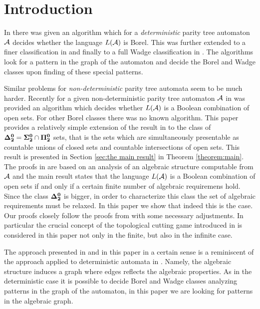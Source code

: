 
\section{Introduction}
In \cite{niwalu} there was given an algorithm which for a \emph{deterministic} parity tree automaton ${\mathcal A}$ decides whether the language $L({\mathcal A})$ is Borel. This was further extended to a finer classification in \cite{murlak2} and finally to a full Wadge classification in \cite{murlak}. The algorithms look for a pattern in the graph of the automaton and decide the Borel and Wadge classes upon finding of these special patterns. 

Similar problems for \emph{non-deterministic} parity tree automata seem to be much harder. 
Recently for a given non-deterministic parity tree automaton ${\mathcal A}$ in \cite{bp} was provided an algorithm which decides
whether $L({\mathcal A})$ is a Boolean combination of open sets. For other Borel classes there was no known algorithm. This paper provides a relatively simple extension 
of the result in \cite{bp} to the class of ${\bf \Delta^0_2} = {\bf\Sigma^0_2}\cap{\bf\Pi^0_2}$ sets, that is the sets which are simultaneously presentable as countable unions of closed sets and countable intersections of open sets. This result is presented in Section \ref{sec:the main result} in Theorem \ref{theorem:main}. The proofs in \cite{bp} are based on an analysis of an algebraic structure computable from ${\mathcal A}$ and the main result states that the language $L({\mathcal A})$ is a Boolean combination of open sets if and only if a certain finite number of algebraic requiremens hold. Since the class ${\bf \Delta^0_2}$ is bigger, in order to characterize this class the set of algebraic requirements must be relaxed. In this paper we show that indeed this is the case. Our proofs closely follow the proofs from \cite{bp} with some necessary adjustments. In particular the crucial concept of the topological cutting game introduced in \cite{bp} is considered in this paper not only in the finite, but also in the infinite case. 

The approach presented in \cite{bp} and in this paper in a certain sense is a reminiscent of the approach applied to deterministic automata in \cite{murlak2,murlak,niwalu}. Namely, the algebraic structure induces a graph where edges reflects the algebraic properties. As in the deterministic case it is possible to decide Borel and Wadge classes analyzing patterns in the graph of the automaton, in this paper we are looking for patterns in the algebraic graph. 

